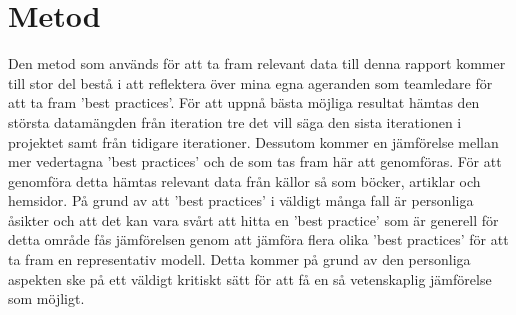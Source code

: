 \section{Metod}
Den metod som används för att ta fram relevant data till denna rapport kommer till stor del bestå i att reflektera över mina egna ageranden som teamledare för att ta fram 'best practices'. För att uppnå bästa möjliga resultat hämtas den största datamängden från iteration tre det vill säga den sista iterationen i projektet samt från tidigare iterationer. Dessutom kommer en jämförelse mellan mer vedertagna 'best practices' och de som tas fram här att genomföras. För att genomföra detta hämtas relevant data från källor så som böcker, artiklar och hemsidor. På grund av att 'best practices' i väldigt många fall är personliga åsikter och att det kan vara svårt att hitta en 'best practice' som är generell för detta område fås jämförelsen genom att jämföra flera olika 'best practices' för att ta fram en representativ modell. Detta kommer på grund av den personliga aspekten ske på ett väldigt kritiskt sätt för att få en så vetenskaplig jämförelse som möjligt.